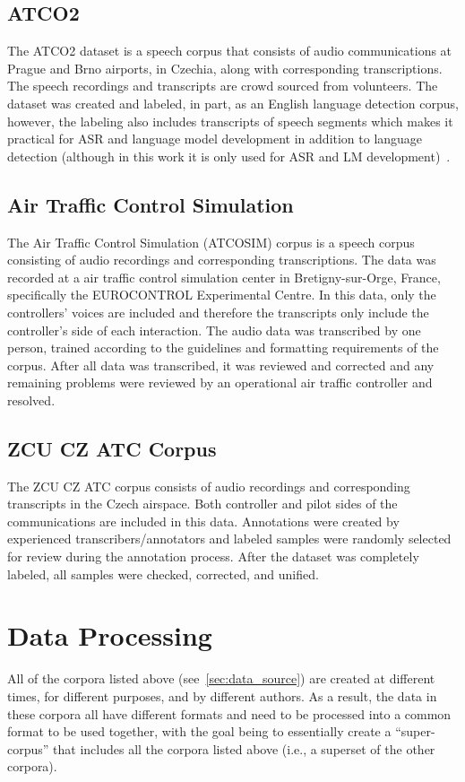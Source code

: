 \documentclass[12pt]{article}
\begin{document}
\subsection{ATCO2}\label{sec:atco2}
The ATCO2 dataset is a speech corpus that consists of audio communications at Prague and Brno airports, in Czechia, along with corresponding
transcriptions. The speech recordings and transcripts are crowd sourced from volunteers. The dataset was created and labeled, in part, as an English
language detection corpus, however, the labeling also includes transcripts of speech segments which makes it practical for ASR and language model
development in addition to language detection (although in this work it is only used for ASR and LM development)~\cite{szoke_detecting_2021}.


\subsection{Air Traffic Control Simulation}\label{sec:atcosim}
The Air Traffic Control Simulation (ATCOSIM) corpus is a speech corpus consisting of audio recordings and corresponding transcriptions.
The data was recorded at a air traffic control simulation center in Bretigny-sur-Orge, France, specifically the EUROCONTROL Experimental Centre.
In this data, only the controllers' voices are included and therefore the transcripts only include the controller's side of each interaction.
The audio data was transcribed by one person, trained according to the guidelines and formatting requirements of the corpus. After all data was
transcribed, it was reviewed and corrected and any remaining problems were reviewed by an operational air traffic controller and
resolved\cite{hofbauer_atcosim_2008}.

\subsection{ZCU CZ ATC Corpus}\label{sec:zcu_atc}
The ZCU CZ ATC corpus consists of audio recordings and corresponding transcripts in the Czech airspace. Both controller and pilot sides of the
communications are included in this data. Annotations were created by experienced transcribers/annotators and labeled samples were randomly selected
for review during the annotation process. After the dataset was completely labeled, all samples were checked, corrected, and
unified\cite{smidl_air_2019}.

\section{Data Processing}\label{sec:data_processing}
All of the corpora listed above (see~\ref{sec:data_source}) are created at different times, for different purposes, and by different authors.
As a result, the data in these corpora all have different formats and need to be processed into a common format to be used together, with the goal
being to essentially create a ``super-corpus'' that includes all the corpora listed above (i.e., a superset of the other corpora).
\end{document}
